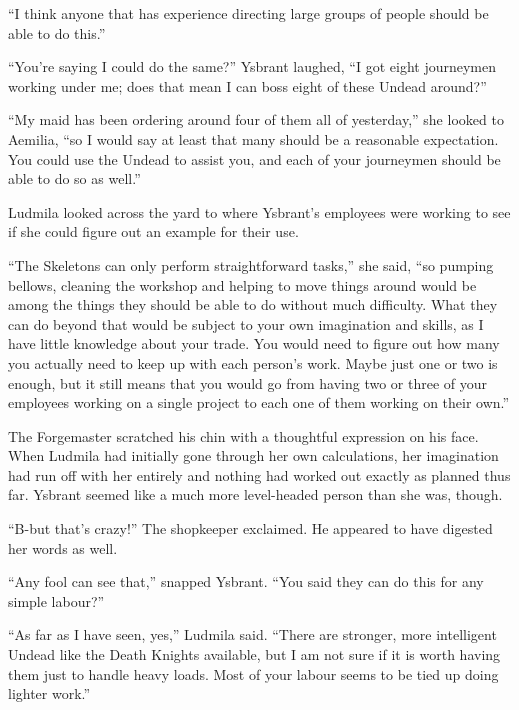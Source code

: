  

“I think anyone that has experience directing large groups of people should be able to do this.”

 

“You’re saying I could do the same?” Ysbrant laughed, “I got eight journeymen working under me; does that mean I can boss eight of these Undead around?”

 

“My maid has been ordering around four of them all of yesterday,” she looked to Aemilia, “so I would say at least that many should be a reasonable expectation. You could use the Undead to assist you, and each of your journeymen should be able to do so as well.”

 

Ludmila looked across the yard to where Ysbrant’s employees were working to see if she could figure out an example for their use.

 

“The Skeletons can only perform straightforward tasks,” she said, “so pumping bellows, cleaning the workshop and helping to move things around would be among the things they should be able to do without much difficulty. What they can do beyond that would be subject to your own imagination and skills, as I have little knowledge about your trade. You would need to figure out how many you actually need to keep up with each person’s work. Maybe just one or two is enough, but it still means that you would go from having two or three of your employees working on a single project to each one of them working on their own.”

 

The Forgemaster scratched his chin with a thoughtful expression on his face. When Ludmila had initially gone through her own calculations, her imagination had run off with her entirely and nothing had worked out exactly as planned thus far. Ysbrant seemed like a much more level-headed person than she was, though.

 

“B-but that’s crazy!” The shopkeeper exclaimed. He appeared to have digested her words as well.

 

“Any fool can see that,” snapped Ysbrant. “You said they can do this for any simple labour?”

 

“As far as I have seen, yes,” Ludmila said. “There are stronger, more intelligent Undead like the Death Knights available, but I am not sure if it is worth having them just to handle heavy loads. Most of your labour seems to be tied up doing lighter work.”

